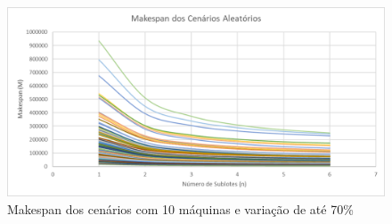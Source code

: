 \begin{figure}[!ht]
    \centering
    \includegraphics[width=12cm]{Resultados/Figuras/M10_70}
    \caption{Makespan dos cenários com 10 máquinas e variação de até 70\%}
    \label{fig:M10_70}
\end{figure}